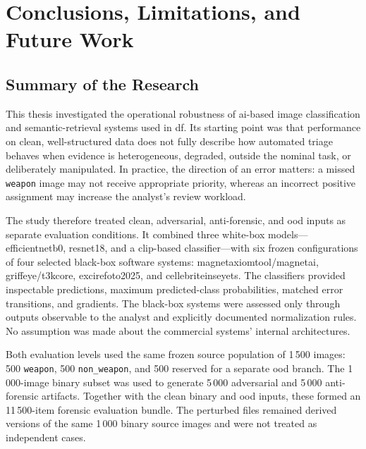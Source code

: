 \chapter{Conclusions, Limitations, and Future Work}
\label{chap:conclusions}


\section{Summary of the Research}
\label{sec:conclusions-summary}

This thesis investigated the operational robustness of \gls{ai}-based image
classification and semantic-retrieval systems used in \gls{df}. Its starting
point was that performance on clean, well-structured data does not fully
describe how automated triage behaves when evidence is heterogeneous,
degraded, outside the nominal task, or deliberately manipulated. In practice,
the direction of an error matters: a missed \texttt{weapon} image may not
receive appropriate priority, whereas an incorrect positive assignment may
increase the analyst's review workload.

The study therefore treated clean, adversarial, anti-forensic, and \gls{ood}
inputs as separate evaluation conditions. It combined three white-box models---\gls{efficientnetb0}, \gls{resnet18}, and a \gls{clip}-based
classifier---with six frozen configurations of four selected black-box software
systems: \gls{magnetaxiomtool}/\gls{magnetai},
\gls{griffeye}/\gls{t3kcore}, \gls{excirefoto2025}, and
\gls{cellebriteinseyets}. The classifiers provided inspectable predictions,
maximum predicted-class probabilities, matched error transitions, and
gradients. The black-box systems were assessed only through outputs observable
to the analyst and explicitly documented normalization rules. No assumption
was made about the commercial systems' internal architectures.

Both evaluation levels used the same frozen source population of 1\,500
images: 500 \texttt{weapon}, 500 \texttt{non\_weapon}, and 500 reserved for a
separate \gls{ood} branch. The 1\,000-image binary subset was used to generate
5\,000 adversarial and 5\,000 anti-forensic artifacts. Together with the clean
binary and \gls{ood} inputs, these formed an 11\,500-item forensic evaluation
bundle.
The perturbed files remained derived versions of the same 1\,000 binary source
images and were not treated as independent cases.

